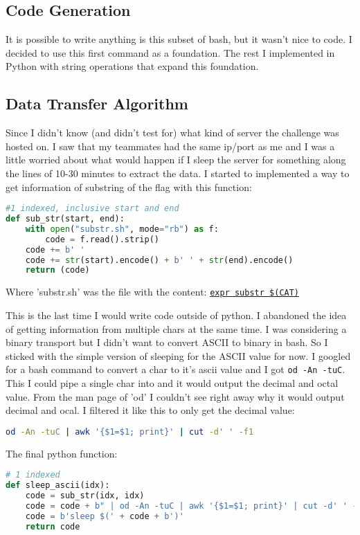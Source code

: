 \documentclass{article}
\begin{document}
\subsection{Code Generation}
It is possible to write anything is this subset of bash, but it wasn't nice to code. I decided to use this first command as a foundation. The rest I implemented in Python with string operations that expand this foundation. 

\subsection{Data Transfer Algorithm}
Since I didn't know (and didn't test for) what kind of server the challenge was hosted on. I saw that my teammates had the same ip/port as me and I was a little worried about what would happen if I sleep the server for something along the lines of 10-30 minutes to extract the data. I started to implemented a way to get information of substring of the flag with this function:
\begin{lstlisting}[language=Python]
#1 indexed, inclusive start and end
def sub_str(start, end):
    with open("substr.sh", mode="rb") as f:
        code = f.read().strip()
    code += b' '
    code += str(start).encode() + b' ' + str(end).encode()
    return (code)    
\end{lstlisting}
Where 'substr.sh' was the file with the content:
\href{https://unix.stackexchange.com/questions/303960/index-a-string-in-bash}{\texttt{expr substr \$(CAT)}}
    
This is the last time I would write code outside of python.
\newline
I abandoned the idea of getting information from multiple chars at the same time. I was considering a binary transport but I didn't want to convert ASCII to binary in bash. So I sticked with the simple version of sleeping for the ASCII value for now.
I googled for a bash command to convert a char to it's ascii value and I got \texttt{od -An -tuC}. This I could pipe a single char into and it would output the decimal and octal value. From the man page of 'od' I couldn't see right away why it would output decimal and ocal. I filtered it like this to only get the decimal value:
\begin{lstlisting}[language=Bash]
    od -An -tuC | awk '{$1=$1; print}' | cut -d' ' -f1
\end{lstlisting}

The final python function:
\begin{lstlisting}[language=Python]
# 1 indexed
def sleep_ascii(idx):
    code = sub_str(idx, idx)
    code = code + b" | od -An -tuC | awk '{$1=$1; print}' | cut -d' ' -f1"
    code = b'sleep $(' + code + b')'
    return code
\end{lstlisting}
\end{document}
